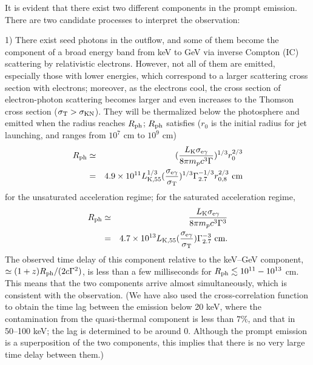 \documentclass[prd,twocolumn,amsmath,amssymb,aps,linenumbers]{revtex4-2} %
\begin{document}
It is evident that there exist two different components in the prompt emission. There are two candidate processes to interpret the observation:


1) There exist seed photons in the outflow, and some of them become the component of a broad energy band from keV to GeV via inverse Compton (IC) scattering by relativistic electrons. However, not all of them are emitted, especially those with lower energies, which correspond to a larger scattering cross section with electrons; moreover, as the electrons cool, the cross section of electron-photon scattering becomes larger and even increases to the Thomson cross section ($\sigma_{\rm T}>\sigma_{\rm KN}$). They will be thermalized below the photosphere and emitted when the radius reaches $R_{\rm ph}$; $R_{\rm ph}$ satisfies ($r_0$ is the initial radius for jet launching, and ranges from $10^7$ cm to $10^9$ cm)~\citep{2018pgrb.book.....Z}
\begin{eqnarray}
    R_{\rm ph}&\simeq&(\frac{L_{\rm K}\sigma_{\rm e\gamma}}{8\pi m_pc^3\Gamma})^{1/3} r_0^{2/3}\nonumber\\
    &=&4.9\times10^{11}L_{\rm K,55} ^{1/3} (\frac{\sigma_{\rm e\gamma}}{\sigma_{\rm T}})^{1/3}\Gamma_{2.7}^{-1/3}r^{2/3}_{0,8}\ \rm cm %
 \end{eqnarray}
 for the unsaturated acceleration regime; for the saturated acceleration regime,
 \begin{eqnarray}
 R_{\rm ph}&\simeq&\frac{L_{\rm K}\sigma_{\rm e\gamma}}{8\pi m_pc^3\Gamma^3}\nonumber\\
    &=& 4.7\times10^{13}L_{\rm K, 55} (\frac{\sigma_{\rm e\gamma}}{\sigma_{\rm T}}) \Gamma_{2.7}^{-3}\ \rm cm.
\end{eqnarray}
The observed time delay of this component relative to the keV--GeV component, $\simeq(1+z)R_{\rm ph}/(2c\Gamma^2)$, is less than a few milliseconds for $R_{\rm ph}\lesssim10^{11}-10^{13}$ cm. This means that the two components arrive almost simultaneously, which is consistent with the observation. (We have also used the cross-correlation function to obtain the time lag between the emission below 20 keV, where the contamination from the quasi-thermal component is less than $7\%$, and that in 50--100 keV; the lag is determined to be around 0. Although the prompt emission is a superposition of the two components, this implies that there is no very large time delay between them.)
\end{document}
